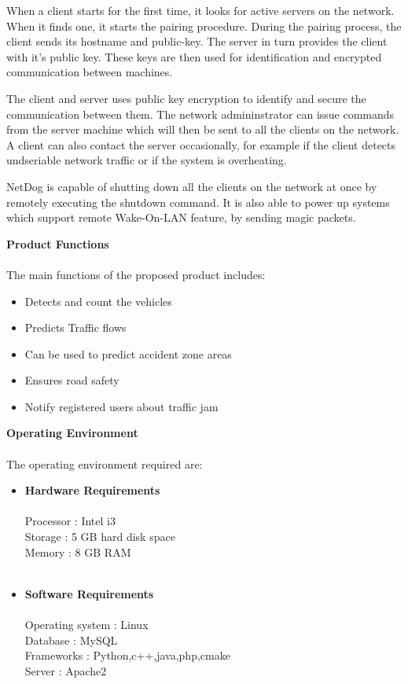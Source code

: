 When a client starts for the first time, it looks for active servers on the
network. When it finds one, it starts the pairing procedure. During the pairing
process, the client sends its hostname and public-key. The server in turn
provides the client with it's public key. These keys are then used for
identification and encrypted communication between machines.

The client and server uses public key encryption to identify and secure the
communication between them. The network admininstrator can issue commands from
the server machine which will then be sent to all the clients on the network.
A client can also contact the server occasionally, for example if the client
detects undseriable network traffic or if the system is overheating.

NetDog is capable of shutting down all the clients on the network at once by
remotely executing the shutdown command. It is also able to power up systems
which support remote Wake-On-LAN feature, by sending magic packets.


\textbf{Product Functions}
\\
\\
The main functions of the proposed product includes:\\ 
\begin{itemize}
\item Detects and count the vehicles
\item Predicts Traffic flows
\item Can be used to predict accident zone areas
\item Ensures road safety
\item Notify registered users about traffic jam
\\
\end{itemize}
\textbf{Operating Environment}
\\ \\
The operating environment required are: \\
\begin{itemize}
\\
\item\textbf{ Hardware Requirements} \\ \\
Processor			:	Intel i3\\
Storage				: 	5 GB hard disk space\\
Memory				: 	8 GB RAM\\ 
\\
\item\textbf{Software Requirements} \\ \\
Operating system	: 	Linux\\
Database			: 	MySQL\\
Frameworks			: 	Python,c++,java,php,cmake\\
Server				: 	Apache2\\ \\ \\
\end{itemize}
